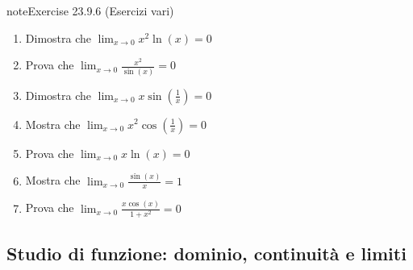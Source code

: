 \documentclass[letterpaper,10pt,italian]{jupyterBook}
\begin{document}
\begin{sphinxadmonition}{note}{Exercise 23.9.6 (Esercizi vari)}
\begin{enumerate}
\item {} 
\sphinxAtStartPar
Dimostra che \(\lim_{x \to 0} x^2 \ln(x) = 0\)

\item {} 
\sphinxAtStartPar
Prova che \(\lim_{x \to 0} \frac{x^2}{\sin(x)} = 0\)

\item {} 
\sphinxAtStartPar
Dimostra che \(\lim_{x \to 0} x \sin\left(\frac{1}{x}\right) = 0\)

\item {} 
\sphinxAtStartPar
Mostra che \(\lim_{x \to 0} x^2 \cos\left(\frac{1}{x}\right) = 0\)

\item {} 
\sphinxAtStartPar
Prova che \(\lim_{x \to 0} x \ln(x) = 0\)

\item {} 
\sphinxAtStartPar
Mostra che \(\lim_{x \to 0} \frac{\sin(x)}{x} = 1\)

\item {} 
\sphinxAtStartPar
Prova che \(\lim_{x \to 0} \frac{x \cos(x)}{1 + x^2} = 0\)

\end{enumerate}
\end{sphinxadmonition}


\subsection{Studio di funzione: dominio, continuità e limiti}
\label{\detokenize{ch/infinitesimal_calculus/analysis-problems:studio-di-funzione-dominio-continuita-e-limiti}}\label{\detokenize{ch/infinitesimal_calculus/analysis-problems:infinitesimal-calculus-analysis-problems-funs}} \label{exercise:ch/infinitesimal_calculus/analysis-problems-exercise-6}
\end{document}
